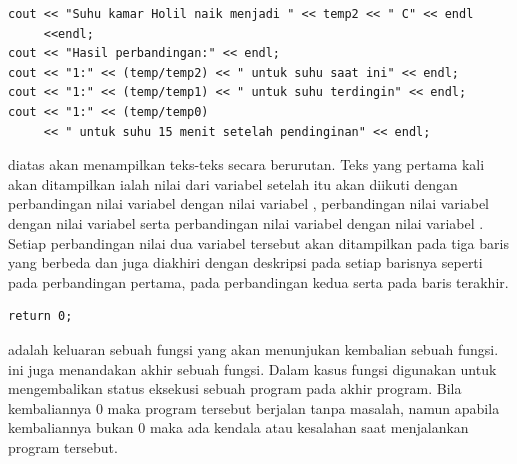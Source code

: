 \documentclass[../main.tex]{subfiles}
\begin{document}
\begin{lstlisting}
cout << "Suhu kamar Holil naik menjadi " << temp2 << " C" << endl 
     <<endl;
cout << "Hasil perbandingan:" << endl;
cout << "1:" << (temp/temp2) << " untuk suhu saat ini" << endl;
cout << "1:" << (temp/temp1) << " untuk suhu terdingin" << endl;
cout << "1:" << (temp/temp0)
     << " untuk suhu 15 menit setelah pendinginan" << endl;
\end{lstlisting}

    \ilz{}{\Script} diatas akan menampilkan teks-teks secara berurutan. Teks yang pertama kali akan ditampilkan ialah nilai dari variabel  setelah itu akan diikuti dengan perbandingan nilai variabel  dengan nilai variabel , perbandingan nilai variabel  dengan nilai variabel  serta perbandingan nilai variabel  dengan nilai variabel . Setiap perbandingan nilai dua variabel tersebut akan ditampilkan pada tiga baris yang berbeda dan juga diakhiri dengan deskripsi pada setiap barisnya seperti  pada perbandingan pertama,  pada perbandingan kedua serta  pada baris terakhir.

\begin{lstlisting}
return 0;
\end{lstlisting}

    \ilz{}{\Script}  adalah {\statement} keluaran sebuah fungsi yang akan menunjukan kembalian sebuah fungsi. {\Statement} ini juga menandakan akhir sebuah fungsi. Dalam kasus fungsi  {\statement}  digunakan untuk mengembalikan status eksekusi sebuah program pada akhir program. Bila kembaliannya 0 maka program tersebut berjalan tanpa masalah, namun apabila kembaliannya bukan 0 maka ada kendala atau kesalahan saat menjalankan program tersebut.
\end{document}
